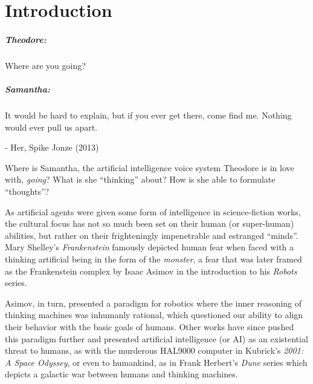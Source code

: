 \chapter{Introduction}
\begin{center}
  \begin{minipage}{0.7\textwidth}
    \begin{small}
      \paragraph{Theodore:} Where are you going?
      \paragraph{Samantha:} It would be hard to explain, but if you ever get there, come find me. Nothing would ever pull us apart. 
    \end{small}
    \begin{flushright}- Her, Spike Jonze (2013) \end{flushright}

  \end{minipage}
\end{center}

Where is Samantha, the artificial intelligence voice system Theodore is in love with, \textit{going}? What is she ``thinking'' about? How is she able to formulate ``thoughts''?

As artificial agents were given some form of intelligence in science-fiction works, the cultural focus has not so much been set on their human (or super-human) abilities, but rather on their frighteningly impenetrable and estranged ``minds''. Mary Shelley's \textit{Frankenstein} famously depicted human fear when faced with a thinking artificial being in the form of the \textit{monster}, a fear that was later framed as the Frankenstein complex by Isaac Asimov in the introduction to his \textit{Robots} series.

Asimov, in turn, presented a paradigm for robotics where the inner reasoning of thinking machines was inhumanly rational, which questioned our ability to align their behavior with the basic goals of humans. Other works have since pushed this paradigm further and presented artificial intelligence (or AI) as an existential threat to humans, as with the murderous HAL9000 computer in Kubrick's \textit{2001: A Space Odyssey}, or even to humankind, as in Frank Herbert's \textit{Dune} series which depicts a galactic war between humans and thinking machines.

